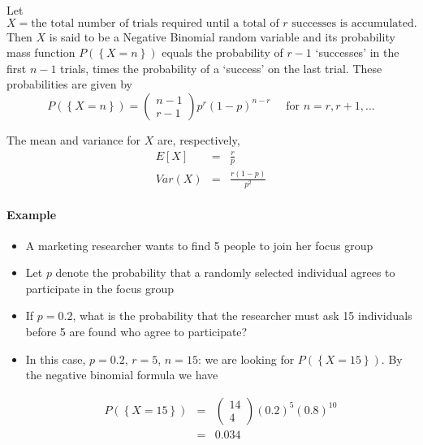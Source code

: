 \documentclass[smaller]{beamer}\usepackage[]{graphicx}\usepackage[]{color}
\renewcommand{\Pr}{P}
\newenvironment{stepitemize}{\begin{itemize}[<+->]}{\end{itemize} }
\begin{document}
\begin{frame}{\secname}
  \begin{definition}
  Let
  $$X= \text{the total number of trials required until a total of $r$ successes is accumulated}.$$
  Then $X$ is said to be a Negative Binomial random variable and its probability mass function
  $\Pr (\left\{ X=n\right\})$ equals the probability of $r-1$ `successes' in the first $n-1$ trials, times the probability of a `success' on
  the last trial. These probabilities are given by%
  \begin{equation*}
  \Pr (\left\{ X=n\right\}) =\left(
  \begin{array}{c}
  n-1 \\
  r-1%
  \end{array}
  \right) p^{r}\left( 1-p\right) ^{n-r}\quad \text{ for }n=r,r+1,...
  \end{equation*}
  \end{definition}

  The mean and variance for $X$ are, respectively,%
  \begin{eqnarray*}
  E\left[ X\right] &=&\frac{r}{p} \\
  Var\left( X\right) &=&\frac{r\left( 1-p\right) }{p^{2}}
  \end{eqnarray*}
\end{frame}%

\begin{frame}{\secname}
  \framesubtitle{Example}

  \begin{example}
  \begin{stepitemize}

  \item A marketing researcher wants to find 5 people to join her focus group

  \item Let $p$ denote the probability that a randomly selected individual
  agrees to participate in the focus group

  \item If $p=0.2$, what is the probability that the researcher must ask 15
  individuals before 5 are found who agree to participate?


  \item In this case, $p=0.2$, $r=5$, $n=15$:  we are looking for $\Pr (\left\{
  X=15\right\}).$ By the negative binomial formula we have

  \begin{eqnarray*}
  \Pr (\left\{ X=15\right\}) &=&\left(
  \begin{array}{c}
  14 \\
  4%
  \end{array}%
  \right) \left( 0.2\right) ^{5}\left( 0.8\right) ^{10} \\
  &=&0.034
  \end{eqnarray*}
  \end{stepitemize}
  \end{example}
\end{frame}
\end{document}
